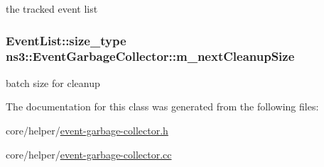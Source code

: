 the tracked event list 

\subsubsection[{\texorpdfstring{m\+\_\+next\+Cleanup\+Size}{m_nextCleanupSize}}]{\setlength{\rightskip}{0pt plus 5cm}Event\+List\+::size\+\_\+type ns3\+::\+Event\+Garbage\+Collector\+::m\+\_\+next\+Cleanup\+Size\hspace{0.3cm}{\ttfamily [private]}}\hypertarget{classns3_1_1EventGarbageCollector_aaa004410658c6a7150930651c7365185}{}\label{classns3_1_1EventGarbageCollector_aaa004410658c6a7150930651c7365185}


batch size for cleanup 



The documentation for this class was generated from the following files\+:\begin{DoxyCompactItemize}
\item 
core/helper/\hyperlink{event-garbage-collector_8h}{event-\/garbage-\/collector.\+h}\item 
core/helper/\hyperlink{event-garbage-collector_8cc}{event-\/garbage-\/collector.\+cc}\end{DoxyCompactItemize}
